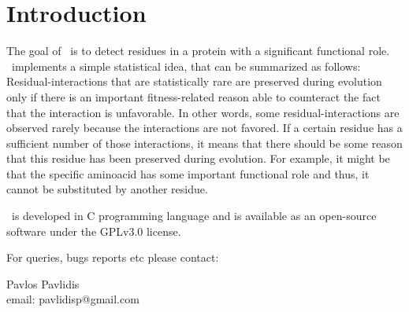 \chapter*{Introduction}

\thispagestyle{empty}

The goal of \prins\ is to detect residues in a protein with a significant functional role. \prins\ implements a simple statistical idea, that can be summarized as follows: Residual-interactions that are statistically rare are preserved during evolution only if there is an important fitness-related reason able to counteract the fact that the interaction is unfavorable. In other words, some residual-interactions are observed rarely because the interactions are not favored. If a certain residue has a sufficient number of those interactions, it means that there should be some reason that this residue has been preserved during evolution. For example, it might be that the specific aminoacid has some important functional role and thus, it cannot be substituted by another residue. 

\prins\ is developed in C programming language and is available as an open-source software under the GPLv3.0 license. 

For queries, bugs reports etc please contact:

Pavlos Pavlidis\\
email: pavlidisp@gmail.com\\


